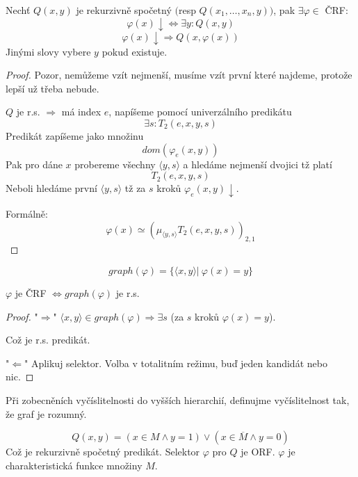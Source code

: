 \begin{theorem}[O selektoru]\label{selector}
	Nechť $Q(x, y)$ je rekurzivně spočetný $($resp $Q(x_1, \ldots, x_n, y))$, pak $\exists \varphi \in$ ČRF:
	\[ \varphi(x) \downarrow \iff \exists y: Q(x, y) \]
		\[ \varphi(x) \downarrow \Rightarrow Q(x, \varphi(x)) \]
	Jinými slovy vybere $y$ pokud existuje.
\end{theorem}
\begin{proof}
	Pozor, nemůžeme vzít nejmenší, musíme vzít první které najdeme, protože lepší už třeba nebude.

	$Q$ je r.s. $\Rightarrow$ má index $e$, napíšeme pomocí univerzálního predikátu
	\[ \exists s: T_2(e, x, y, s) \]
	Predikát zapíšeme jako množinu
	\[ dom(\varphi_e(x, y)) \]
	Pak pro dáne $x$ probereme všechny $\langle y, s \rangle$ a hledáme nejmenší dvojici tž platí
	\[ T_2(e, x, y, s) \]
	Neboli hledáme první $\langle y, s \rangle$ tž za $s$ kroků $\varphi_e(x,y) \downarrow$.

	Formálně:
	\[ \varphi(x) \simeq (\mu_{\langle y, s \rangle} T_2(e, x, y, s))_{2,1} \]
\end{proof}

\begin{definition}
	\[ graph(\varphi) = \{ \langle x, y \rangle |\ \varphi(x) = y \} \]
\end{definition}
\begin{consequence}
	$\varphi$ je ČRF $\iff graph(\varphi)$ je r.s.
\end{consequence}
\begin{proof}
	"$\Rightarrow$" $\langle x, y \rangle \in graph(\varphi) \Rightarrow \exists s$ (za $s$ kroků $\varphi(x) = y$).

	Což je r.s. predikát.

	"$\Leftarrow$" Aplikuj selektor. Volba v totalitním režimu, buď jeden kandidát nebo nic.
\end{proof}

\begin{note}
	Při zobecněních vyčíslitelnosti do vyšších hierarchií, definujme vyčíslitelnost tak, že graf je rozumný.
\end{note}

\begin{theorem}
	\[ Q(x,y) = (x \in M \land y = 1) \lor (x \in \overline{M} \land y = 0) \]
	Což je rekurzivně spočetný predikát.
	Selektor $\varphi$ pro $Q$ je ORF.
	$\varphi$ je charakteristická funkce množiny $M$.
\end{theorem}

